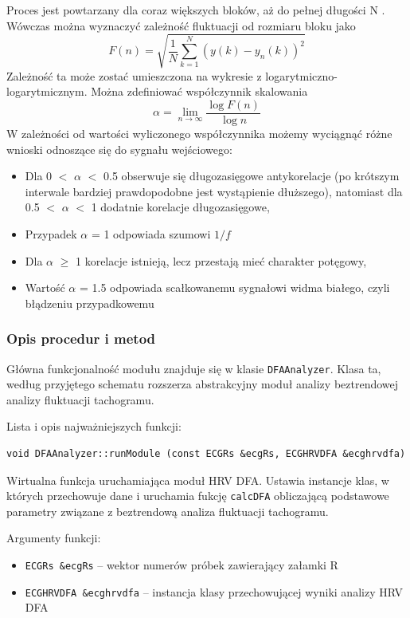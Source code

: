 \documentclass[a4paper, 11pt]{article}
\begin{document}
Proces jest powtarzany dla coraz większych bloków, aż do pełnej długości N . Wówczas
można wyznaczyć zależność fluktuacji od rozmiaru bloku jako
\begin{equation}
F(n) = \sqrt{\frac{1}{N}\sum_{k=1}^{N}(y(k) - y_n(k))^2}
\end{equation}
Zależność ta może zostać umieszczona na wykresie z logarytmiczno-logarytmicznym. Można
zdefiniować współczynnik skalowania
\begin{equation}
\alpha = \lim_{n \to \infty}\frac{\log F(n)}{\log n}
\end{equation}
W zależności od wartości wyliczonego współczynnika możemy wyciągnąć różne wnioski odnoszące się do sygnału wejściowego:
  \begin{itemize}
  \item Dla 0 $<$ $\alpha$ $<$ 0.5 obserwuje się
długozasięgowe antykorelacje (po
krótszym interwale bardziej
prawdopodobne jest wystąpienie
dłuższego), natomiast dla 0.5 $<$ $\alpha$ $<$ 1
dodatnie korelacje długozasięgowe,
  \item Przypadek $\alpha$ = 1 odpowiada szumowi $1/f$
  \item Dla $\alpha$ $\geq$ 1 korelacje istnieją, lecz przestają
mieć charakter potęgowy,
  \item Wartość $\alpha$ = 1.5 odpowiada scałkowanemu
sygnałowi widma białego, czyli błądzeniu
przypadkowemu
  \end{itemize}


\subsubsection{Opis procedur i metod}
\label{sec:dfa:procs}
Główna funkcjonalność modułu znajduje się w klasie \verb|DFAAnalyzer|. Klasa ta,
według przyjętego schematu rozszerza abstrakcyjny moduł analizy beztrendowej analizy fluktuacji tachogramu.
 

Lista i opis najważniejszych funkcji:

\begin{lstlisting}
void DFAAnalyzer::runModule (const ECGRs &ecgRs, ECGHRVDFA &ecghrvdfa)
\end{lstlisting}

Wirtualna funkcja uruchamiająca moduł HRV DFA. Ustawia instancje klas, w których przechowuje dane i uruchamia fukcję \verb|calcDFA| obliczającą podstawowe parametry związane z beztrendową analiza fluktuacji tachogramu.

Argumenty funkcji:
\begin{itemize}
\item \verb+ECGRs &ecgRs+ -- wektor numerów próbek zawierający załamki R
\item \verb+ECGHRVDFA &ecghrvdfa+ -- instancja klasy przechowującej wyniki analizy HRV DFA
\end{itemize}
\medskip{}
\end{document}
